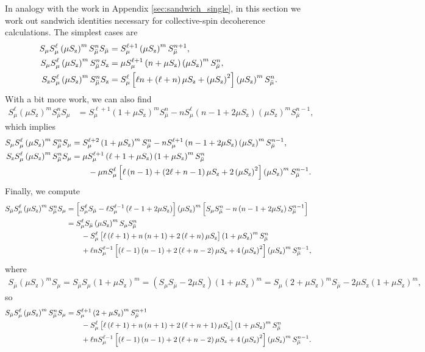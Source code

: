\documentclass[pra,reprint,longbibliography]{revtex4-1}
\newcommand{\p}[1]{\left(#1\right)} %
\renewcommand{\sp}[1]{\left[#1\right]} %
\newcommand{\z}{\text{z}}
\newcommand{\bmu}{{\bar\mu}}
\newcommand{\1}{\mathds{1}}
\begin{document}
In analogy with the work in Appendix \ref{sec:sandwich_single}, in
this section we work out sandwich identities necessary for
collective-spin decoherence calculations.  The simplest cases are
\begin{align}
  S_\mu S_\mu^\ell \p{\mu S_\z}^m S_\bmu^n S_\bmu
  &= S_\mu^{\ell+1} \p{\mu S_\z}^m S_\bmu^{n+1},
  \allowdisplaybreaks \\
  S_\mu S_\mu^\ell \p{\mu S_\z}^m S_\bmu^n S_\z
  &= \mu S_\mu^{\ell+1} \p{n+\mu S_\z} \p{\mu S_\z}^m S_\bmu^n,
  \allowdisplaybreaks \\
  S_\z S_\mu^\ell \p{\mu S_\z}^m S_\bmu^n S_\z
  &= S_\mu^\ell \sp{\ell n + \p{\ell+n} \mu S_\z + \p{\mu S_\z}^2}
  \p{\mu S_\z}^m S_\bmu^n.
\end{align}
With a bit more work, we can also find
\begin{align}
  S_\mu^\ell \p{\mu S_\z}^m S_\bmu^n S_\mu
  &= S_\mu^{\ell+1} \p{1+\mu S_\z}^m S_\bmu^n
  - n S_\mu^\ell \p{n-1+2\mu S_\z} \p{\mu S_\z}^m S_\bmu^{n-1},
\end{align}
which implies
\begin{align}
  S_\mu S_\mu^\ell \p{\mu S_\z}^m S_\bmu^n S_\mu
  &= S_\mu^{\ell+2} \p{1+\mu S_\z}^m S_\bmu^n
  - n S_\mu^{\ell+1} \p{n-1+2\mu S_\z} \p{\mu S_\z}^m S_\bmu^{n-1},
  \allowdisplaybreaks \\
  S_\z S_\mu^\ell \p{\mu S_\z}^m S_\bmu^n S_\mu
  &= \mu S_\mu^{\ell+1} \p{\ell+1+\mu S_\z} \p{1+\mu S_\z}^m S_\bmu^n
  \notag \\
  &\qquad - \mu n S_\mu^\ell
  \sp{\ell\p{n-1} + \p{2\ell+n-1}\mu S_\z + 2\p{\mu S_\z}^2}
  \p{\mu S_\z}^m S_\bmu^{n-1}.
\end{align}
Finally, we compute
\begin{align}
  S_\bmu S_\mu^\ell \p{\mu S_\z}^m S_\bmu^n S_\mu
  &= \sp{S_\mu^\ell S_\bmu - \ell S_\mu^{\ell-1} \p{\ell-1+2\mu S_\z}}
  \p{\mu S_\z}^m
  \sp{S_\mu S_\bmu^n - n \p{n-1+2\mu S_\z} S_\bmu^{n-1}} \notag \\
  &= S_\mu^\ell S_\bmu \p{\mu S_\z}^m S_\mu S_\bmu^n \notag \\
  &\qquad - S_\mu^\ell
  \sp{\ell\p{\ell+1} + n\p{n+1}+2\p{\ell+n}\mu S_\z}
  \p{1+\mu S_\z}^m S_\bmu^n \notag \\
  &\qquad + \ell n S_\mu^{\ell-1}
  \sp{\p{\ell-1}\p{n-1}+2\p{\ell+n-2}\mu S_\z + 4\p{\mu S_\z}^2}
  \p{\mu S_\z}^m S_\bmu^{n-1},
\end{align}
where
\begin{multline}
  S_\bmu \p{\mu S_\z}^m S_\mu
  = S_\bmu S_\mu \p{1+\mu S_\z}^m
  = \p{S_\mu S_\bmu - 2\mu S_\z} \p{1+\mu S_\z}^m
  = S_\mu \p{2+\mu S_\z}^m S_\bmu - 2\mu S_\z \p{1+\mu S_\z}^m,
\end{multline}
so
\begin{align}
  S_\bmu S_\mu^\ell \p{\mu S_\z}^m S_\bmu^n S_\mu
  &= S_\mu^{\ell+1} \p{2+\mu S_\z}^m S_\bmu^{n+1} \notag \\
  &\qquad - S_\mu^\ell
  \sp{\ell\p{\ell+1} + n\p{n+1}+2\p{\ell+n+1}\mu S_\z}
  \p{1+\mu S_\z}^m S_\bmu^n \notag \\
  &\qquad + \ell n S_\mu^{\ell-1}
  \sp{\p{\ell-1}\p{n-1}+2\p{\ell+n-2}\mu S_\z + 4\p{\mu S_\z}^2}
  \p{\mu S_\z}^m S_\bmu^{n-1}.
\end{align}
\end{document}
